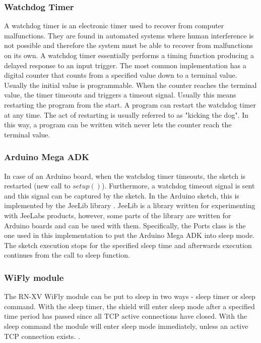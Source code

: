 \subsubsection{Watchdog Timer}
A watchdog timer \cite{watchdog_timer} is an electronic timer used to recover from computer malfunctions. They are found in automated systems where human interference is not possible and therefore the system must be able to recover from malfunctions on its own. 
A watchdog timer essentially performs a timing function producing a delayed response to an input trigger. The most common implementation has a digital counter that counts from a specified value down to a terminal value. Usually the initial value is programmable. When the counter reaches the terminal value, the timer timeouts and triggers a timeout signal. Usually this means restarting the program from the start. A program can restart the watchdog timer at any time. The act of restarting is usually referred to as "kicking the dog". In this way, a program can be written witch never lets the counter reach the terminal value.

\subsubsection{Arduino Mega ADK}

In case of an Arduino board, when the watchdog timer timeouts, the sketch is restarted (new call to $setup()$). Furthermore, a watchdog timeout signal is sent and this signal can be captured by the sketch. In the Arduino sketch, this is implemented by the JeeLib library \cite{jeelib_general}. JeeLib is a library written for experimenting with JeeLabs products, however, some parts of the library are written for Arduino boards and can be used with them. Specifically, the Ports class \cite{jeelib_port} is the one used in this implementation to put the Arduino Mega ADK into sleep mode. The sketch execution stops for the specified sleep time and afterwards execution continues from the call to sleep function.


\subsubsection{WiFly module}

The RN-XV WiFly module can be put to sleep in two ways - sleep timer or sleep command. With the sleep timer, the shield will enter sleep mode after a specified time period has passed since all TCP active connections have closed. With the sleep command the module will enter sleep mode immediately, unless an active TCP connection exists. \cite{wifly_manual}. 

